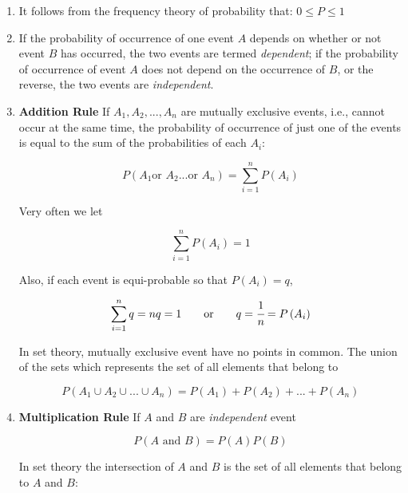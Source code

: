 \documentclass[a4paper,fleqn]{cas-dc}
\begin{document}
\begin{enumerate}
	\item It follows from the frequency theory of probability that: $0 \leq P \leq 1$
	\item If the probability of occurrence of one event $A$ depends on whether or not event $B$ has occurred, the two events are termed \textit{dependent}; if the probability of occurrence of event $A$ does not depend on the occurrence of $B$, or the reverse, the two events are \textit{independent}.
	\item \textbf{Addition Rule}
	If $A_1,A_2,...,A_n$ are mutually exclusive events, i.e., cannot occur at the same time, the probability of occurrence of just one of the events is equal to the sum of the probabilities of each $A_i$:
	
	{\footnotesize
	\begin{equation}
		P\left( A_1 \text{or~} A_2... \text{or~} A_n \right) = \sum_{i=1}^{n} P\left( A_i \right)
	\end{equation} }

	Very often we let
	
	{\footnotesize
	\begin{equation}
		\sum_{i=1}^{n} P\left( A_i \right) = 1
	\end{equation} }
	
	Also, if each event is equi-probable so that $P(A_i) = q$,
	
	{\footnotesize
	\begin{equation}
		\sum_{i=1}^{n} q = nq = 1 \qquad \text{or} \qquad  q=\cfrac{1}{n} = P\left( A_i \right)
	\end{equation} }
	
	In set theory, mutually exclusive event have no points in common. The union of the sets which represents the set of all elements that belong to
	
	{\footnotesize
	\begin{equation}
		P\left( A_1 \cup A_2 \cup ... \cup A_n \right) = P(A_1) + P(A_2) + ... + P(A_n)
	\end{equation} }

	\item \textbf{Multiplication Rule}
	If $A$ and $B$ are \textit{independent} event
	
	{\footnotesize
	\begin{equation}
		P\left( A \text{~and~} B\right) = P(A)P(B)
	\end{equation} }
	
	In set theory the intersection of $A$ and $B$ is the set of all elements that belong to $A$ and $B$:


\end{enumerate}
\end{document}
